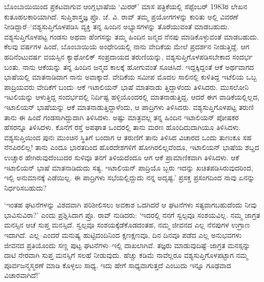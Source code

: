 ಬೊಂಬಾಯಿಯಿಂದ ಪ್ರಕಟವಾಗುವ ಆಂಗ್ಲಭಾಷೆಯ ‘ಮಿರರ್​’ ಮಾಸ ಪತ್ರಿಕೆಯಲ್ಲಿ ಸೆಪ್ಟೆಂಬರ್ 1983ರ ಲೇಖನ ಕುತೂಹಲಕಾರಿಯಾಗಿದೆ. ಸುಪ್ತಿಶಾಸ್ತ್ರಜ್ಞ ಪ್ರೊ. ಜೆ. ವಿ. ರಾವ್ ತಮ್ಮ ಪ್ರಯೋಗಗಳನ್ನು ಕುರಿತು ಅಲ್ಲಿ ವಿವರಣೆ ನೀಡಿದ್ದಾರೆ–‘ವಶ್ಯಸುಪ್ತಿಗೊಳಪಡಿಸಿ ವ್ಯಕ್ತಿ ತನ್ನ ಹಿಂದಿನ ಅಭ್ಯಾಸಗಳನ್ನು ತೊರೆಯುವಂತೆ ಮಾಡಬಹುದು. ವಶ್ಯಸುಪ್ತಿಗೊಳಪಟ್ಟ ಗಂಡಸು ಅಥವಾ ಹೆಂಗಸನ್ನು ತಮ್ಮ ಹಿಂದಿನ ಜನ್ಮದ ನೆನಪು ಮಾಡಿಕೊಳ್ಳುವಂತೆ ಮಾಡಬಹುದು. ಕೆಲವು ವರ್ಷಗಳ ಹಿಂದೆ, ಬೊಂಬಾಯಿಯ ಅಂಧೇರಿಯಲ್ಲಿ ನಾನು ವೇದಿಕೆಯ ಮೇಲೆ ಪ್ರದರ್ಶನ ನೀಡುತ್ತಿದ್ದೆ. ಆಗ ಹದಿನೆಂಟುವರ್ಷ ವಯಸ್ಸಿನ ಕ್ಯಾಥೋಲಿಕ್ ಸಂಪ್ರದಾಯದ ತರುಣಿಯನ್ನು, ವಶ್ಯಸುಪ್ತಿಗೊಳಪಡಿಸಬೇಕಾದ ಸಂದರ್ಭ ಬಂತು. ನಾನು ಆಕೆಯನ್ನು ತನ್ನ ಹಿಂದಿನ ಜನ್ಮದ ಕಾಲಕ್ಕೆ ಹೋಗುವಂತೆ ಸೂಚಿಸಿದೆ. ಇದ್ದಕ್ಕಿದ್ದಂತೆ ಆಕೆ ಅರ್ಥವಾಗದ ಭಾಷೆಯಲ್ಲಿ ಮಾತನಾಡಿದಾಗ ನಾನು ಅವಾಕ್ಕಾದೆ. ವೇದಿಕೆಯ ಸಮೀಪ ಮೊದಲ ಸಾಲಿನಲ್ಲಿ ಕುಳಿತಿದ್ದ ಇಟೆಲಿಯ ಒಬ್ಬ ಪಾದ್ರಿಯವರು ವೇದಿಕೆಗೆ ಬಂದು–ಆಕೆ ಇಟಾಲಿಯನ್ ಭಾಷೆ ಮಾತನಾಡು ತ್ತಿದ್ದಾಳೆಂದು ತಿಳಿಸಿದರು. ಮುಸಲೋನಿ ಇಟಲಿಯನ್ನು ಆಳುತ್ತಿದ್ದ ಸಂದರ್ಭದಲ್ಲಿ ನಿರ್ದಿಷ್ಟ ಹಳ್ಳಿಯೊಂದರಲ್ಲಿ ಮಾತನಾಡುತ್ತಿದ್ದ, ಆದರೆ ಈಗ ವಾಡಿಕೆಯಲ್ಲಿಲ್ಲದ, ಇಟಾಲಿಯನ್ ಭಾಷೆಯನ್ನು ಆಕೆ ಮಾತನಾಡುತ್ತಿದ್ದಾಳೆಂದು, ಆ ಪಾದ್ರಿಗಳು ತಿಳಿಸಿದರು. ವಶ್ಯಸುಪ್ತಿಗೊಳಪಟ್ಟ ತರುಣಿ ತಾನು ಈ ಹಿಂದೆ ಗಂಡಸಾಗಿದ್ದುದಾಗಿ ತಿಳಿಸಿದಳು. ಅಷ್ಟು ಮಾತ್ರವಲ್ಲ ತನ್ನ ಹಿಂದಿನ ಇಟಾಲಿಯನ್ ಪೋಷಕರ ಹೆಸರನ್ನೂ ತಿಳಿಸಿದಳು. ಕೊನೆಗೆ ರಸ್ತೆ ಅಪಘಾತ ಒಂದರಲ್ಲಿ ತಾನು ಮರಣ ಹೊಂದಿದುದಾಗಿಯೂ ತಿಳಿಸಿದಳು. ವಶ್ಯಸುಪ್ತಿಯಿಂದ ಪುನಃ ಮುಂಚಿನ ಸ್ಥಿತಿಗೆ ಬಂದಾಗ ಆ ತರುಣಿಗೆ ತಾನು ತಿಳಿಸಿದ ವಿಚಾರದ ಒಂದು ತುಣುಕೂ ಸಹ ನೆನಪಿರಲಿಲ್ಲ! ತಾನು ಎಂದೂ ಭಾರತದಿಂದ ಹೊರದೇಶಗಳಿಗೆ ಹೋಗಿರಲಿಲ್ಲವೆಂದೂ, ಇಟಾಲಿಯನ್ ಭಾಷೆಯ ಶಬ್ದದ ಉಚ್ಚಾರ ಹೇಗಿರುವುದೆಂಬುದರ ಸುಳಿವೂ ತನಗೆ ತಿಳಿಯದೆಂದೂ ಆಗ ಆಕೆ ಪ್ರಾಮಾಣಿಕವಾಗಿ ತಿಳಿಸಿದಳು. ಆಕೆ ಇಟಾಲಿಯನ್ ಭಾಷೆ ಮಾತನಾಡಿದುದು ಸತ್ಯ. ಇಟಾಲಿಯನ್ ಪಾದ್ರಿಯೊ ಬ್ಬರು ಇದನ್ನು ಖಚಿತಪಡಿಸಿರುವುದರಿಂದ, ಇಲ್ಲಿ ಅನುಮಾನಕ್ಕೆ ಎಡೆಯಿಲ್ಲ. ಈ ಪಾದ್ರಿಗಳು ಸಭೆಯಲ್ಲಿದ್ದುದು ನನ್ನ ಅದೃಷ್ಟ.’ ಪ್ರಸಕ್ತ ಪ್ರಸಂಗದಿಂದ ನಾವು ಏನನ್ನು ನಿರ್ಧರಿಸಬಹುದು?

‘ಇಂತಹ ಘಟನೆಗಳನ್ನು ವಿಶದವಾಗಿ ಪರಿಶೀಲಿಸಲು ಅವಕಾಶ ಒದಗಿದರೆ ಆ ಘಟನೆಗಳು ಸತ್ಯವಾಗಬಹುದೆಂದು ನೀವು ಭಾವಿಸುವಿರಾ?’ ಎಂದು ಪ್ರಶ್ನಿಸಿದಾಗ ಪ್ರೊ. ರಾವ್ ನುಡಿದರು: ‘ಇದರಲ್ಲಿ ನನಗೆ ಸ್ವಲ್ಪವೂ ಸಂಶಯವಿಲ್ಲ. ನಮ್ಮ ಜಾಗ್ರತ ಮನಸ್ಸಿನ ಆಚೆ ಸುಪ್ತ ಮನಸ್ಸಿದೆ. ಸ್ವಲ್ಪವೂ ಸಂಶಯಕ್ಕೆಡೆಕೊಡದಂತಹ, ನಮ್ಮ ಜೀವನದ ಎಲ್ಲ ನೆನಪುಗಳ ಉಗ್ರಾಣ ಇದಾಗಿದೆ. ಎಲ್ಲ–ಎಂದರೆ ಮನುಷ್ಯ ಹುಟ್ಟಿದಂದಿನಿಂದ ಕ್ಷಣಕ್ಷಣವೂ, ದಿನ ದಿನವೂ ಪಡೆದ ಎಲ್ಲ ಅನುಭವಗಳು ಜೀವನದ ಪ್ರತಿಯೊಂದು ಸಣ್ಣ ಪುಟ್ಟ ಘಟನೆಗಳು–ಇಲ್ಲಿ ದಾಖಲಾಗಿವೆ. ತಜ್ಞರು ಮಾಡುವುದಿಷ್ಟೆ–ಜಾಗ್ರತ ಮನಸ್ಸನ್ನು ದಾಟಿ ನೇರವಾಗಿ ಸುಪ್ತ ಮನಸ್ಸಿಗೆ ಸಲಹೆ ನೀಡುವುದು. ಹೆಚ್ಚು ಕಡಿಮೆ ನಾವೆಲ್ಲರೂ ವಶ್ಯಸುಪ್ತಿಗೊಳಪಟ್ಟಾಗ ನಮ್ಮ ಪೂರ್ವಜನ್ಮಸ್ಮರಣೆ ಮಾಡಿ ಕೊಳ್ಳಲು ಸಾಧ್ಯ. ಇದು ಹೇಗೆ ಸಾಧ್ಯವಾಗುತ್ತದೆ ಎಂಬುದು ಇನ್ನೂ ಗೂಢವಾದ ವಿಚಾರವಾಗಿದೆ!’

